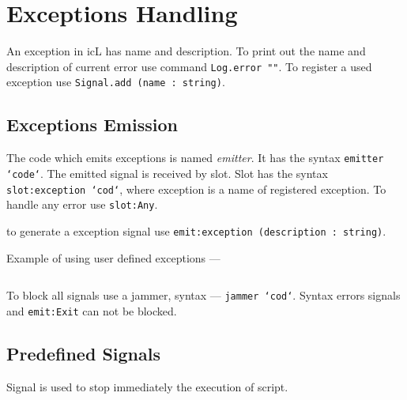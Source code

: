 \section{Exceptions Handling}

An exception in icL has name and description. To print out the name and description of current error use command \texttt{Log.error ""}. To register a used exception use \texttt{Signal.add (name : string)}.

\subsection{Exceptions Emission}

The code which emits exceptions is named {\it emitter}. It has the syntax \texttt{emitter {`code`}}. The emitted signal is received by slot. Slot has the syntax \texttt{slot:exception {`cod`}}, where exception is a name of registered exception. To handle any error use \texttt{slot:Any}.

to generate a exception signal use \texttt{emit:exception (description : string)}.

Example of using user defined exceptions —
\inputminted[linenos]{icl}{../sources/sighandling.icL}

To block all signals use a jammer, syntax — \texttt{jammer {`cod`}}. Syntax errors signals and \texttt{emit:Exit} can not be blocked.

\subsection{Predefined Signals}

Signal  is used to stop immediately the execution of script.


